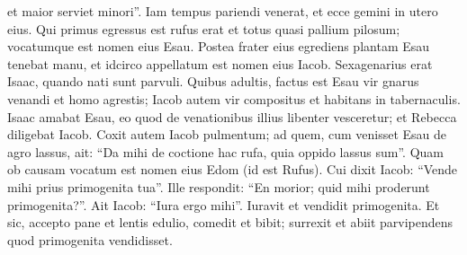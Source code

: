 \begin{biblechapter}
\begin{biblechapter}
\begin{biblechapter}
\begin{biblechapter}
\begin{biblechapter}
\begin{biblechapter}
\begin{biblechapter}
\begin{biblechapter}
\begin{biblechapter}
\begin{biblechapter}
\begin{biblechapter}
\begin{biblechapter}
\begin{biblechapter}
\begin{biblechapter}
\begin{biblechapter}
\begin{biblechapter}
\begin{biblechapter}
\begin{biblechapter}
\begin{biblechapter}
\begin{biblechapter}
\begin{biblechapter}
\begin{biblechapter}
\begin{biblechapter}
\begin{biblechapter}
\begin{biblechapter}
 et maior serviet minori”.
 \verse Iam tempus pariendi venerat, et ecce gemini in utero eius. 
\verse Qui primus egressus est rufus erat et totus quasi pallium pilosum; vocatumque est nomen eius Esau. Postea frater eius egrediens plantam Esau tenebat manu, et idcirco appellatum est nomen eius Iacob. 
\verse Sexagenarius erat Isaac, quando nati sunt parvuli.
 \verse Quibus adultis, factus est Esau vir gnarus venandi et homo agrestis; Iacob autem vir compositus et habitans in tabernaculis. 
\verse Isaac amabat Esau, eo quod de venationibus illius libenter vesceretur; et Rebecca diligebat Iacob. 
 \verse Coxit autem Iacob pulmentum; ad quem, cum venisset Esau de agro lassus, 
 \verse ait: “Da mihi de coctione hac rufa, quia oppido lassus sum”. Quam ob causam vocatum est nomen eius Edom (id est Rufus). 
\verse Cui dixit Iacob: “Vende mihi prius primogenita tua”. 
\verse Ille respondit: “En morior; quid mihi proderunt primogenita?”. 
\verse Ait Iacob: “Iura ergo mihi”. Iuravit et vendidit primogenita. 
\verse Et sic, accepto pane et lentis edulio, comedit et bibit; surrexit et abiit parvipendens quod primogenita vendidisset.
 

\end{biblechapter}
\end{biblechapter}
\end{biblechapter}
\end{biblechapter}
\end{biblechapter}
\end{biblechapter}
\end{biblechapter}
\end{biblechapter}
\end{biblechapter}
\end{biblechapter}
\end{biblechapter}
\end{biblechapter}
\end{biblechapter}
\end{biblechapter}
\end{biblechapter}
\end{biblechapter}
\end{biblechapter}
\end{biblechapter}
\end{biblechapter}
\end{biblechapter}
\end{biblechapter}
\end{biblechapter}
\end{biblechapter}
\end{biblechapter}
\end{biblechapter}
